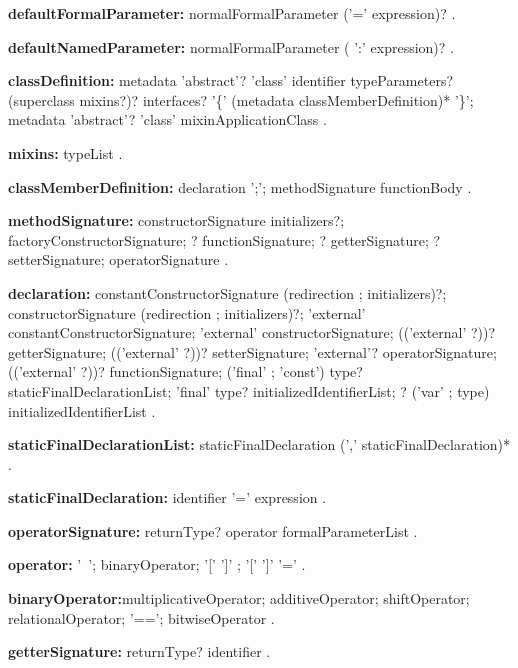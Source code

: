 \begin{grammar}
{\bf defaultFormalParameter:}
    normalFormalParameter ('=' expression)?
    .   
        
{\bf defaultNamedParameter:}
    normalFormalParameter ( ':' expression)?
    .   
\end{grammar}
\begin{grammar}
{\bf classDefinition:}
    metadata 'abstract'?  'class' identifier typeParameters? (superclass mixins?)? interfaces?
    '\{' (metadata classMemberDefinition)* '\}';
    metadata 'abstract'?  'class' mixinApplicationClass
    .
    
{\bf mixins:}
    \WITH{} typeList
    .

{\bf classMemberDefinition:}
    declaration ';';
    methodSignature functionBody
    .

{\bf methodSignature:}
    constructorSignature initializers?;
    factoryConstructorSignature;
    \STATIC{}? functionSignature;
    \STATIC{}? getterSignature;
    \STATIC{}? setterSignature;
    operatorSignature
    .

{\bf declaration:}
    constantConstructorSignature (redirection ; initializers)?;
    constructorSignature (redirection ; initializers)?;
    'external' constantConstructorSignature;
    'external' constructorSignature;
    (('external' \STATIC{}?))? getterSignature;
    (('external' \STATIC{}?))? setterSignature;
    'external'? operatorSignature;
     (('external' \STATIC{}?))? functionSignature;
    \STATIC{} ('final' ; 'const') type? staticFinalDeclarationList;
    'final' type? initializedIdentifierList;
    \STATIC{}? ('var' ; type) initializedIdentifierList
    .

{\bf staticFinalDeclarationList:}
    staticFinalDeclaration (',' staticFinalDeclaration)*
    .

{\bf staticFinalDeclaration:}
    identifier '=' expression
    .
\end{grammar}
\begin{grammar}
{\bf operatorSignature:}
    returnType? \OPERATOR{} operator formalParameterList
    .
       
{\bf operator:}
    '~';
    binaryOperator;
    '[' ']' ;
    '[' ']' '='
    .

{\bf binaryOperator:}multiplicativeOperator;
    additiveOperator;
    shiftOperator;
    relationalOperator;
    '==';
    bitwiseOperator
    .
\end{grammar}
\begin{grammar}
{\bf getterSignature:}
    returnType? \GET{} identifier 
    .
\end{grammar}
